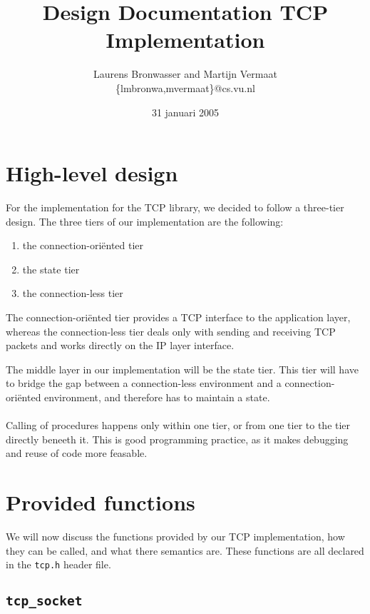 \documentclass[11pt]{article}
\title{Design Documentation TCP Implementation}
\author{
    Laurens Bronwasser and Martijn Vermaat\\
    \{lmbronwa,mvermaat\}@cs.vu.nl
}
\date{31 januari 2005}
\begin{document}
\maketitle


\lstset{
  numbers=none,
  basicstyle=\small,
  frame=tb,
  language=C,
  captionpos=b
}


\section{High-level design}

For the implementation for the TCP library, we decided to follow a three-tier
design. The three tiers of our implementation are the following:

\begin{enumerate}
\item the connection-ori\"ented tier
\item the state tier
\item the connection-less tier
\end{enumerate}

The connection-ori\"ented tier provides a TCP interface to the application
layer, whereas the connection-less tier deals only with sending and
receiving TCP packets and works directly on the IP layer interface.

The middle layer in our implementation will be the state tier. This tier
will have to bridge the gap between a connection-less environment and a
connection-ori\"ented environment, and therefore has to maintain a state.

\paragraph{}

Calling of procedures happens only within one tier, or from one tier to
the tier directly beneeth it. This is good programming practice, as it makes
debugging and reuse of code more feasable.


\section{Provided functions}

We will now discuss the functions provided by our TCP implementation, how they
can be called, and what there semantics are. These functions are all declared in
the \lstinline|tcp.h| header file.


\subsection{\lstinline{tcp_socket}}
\end{document}
